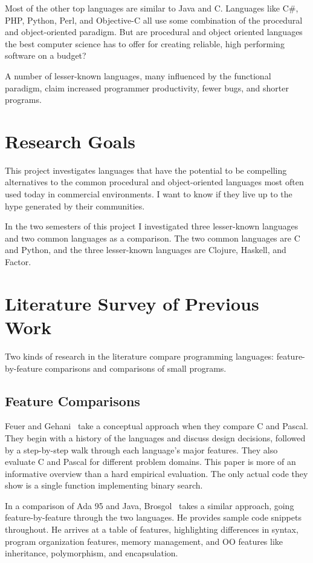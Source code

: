 \documentclass{article}
\begin{document}
Most of the other top languages are similar to Java and C.  Languages
like C\#, PHP, Python, Perl, and Objective-C all use some combination of the
procedural and object-oriented paradigm.   But are procedural and object
oriented languages the best computer science has to offer for creating
reliable, high performing software on a budget?

A number of lesser-known languages, many influenced by the functional
paradigm, claim increased programmer productivity, fewer bugs, and shorter
programs.

\section{Research Goals}

This project investigates languages that have the potential to be
compelling alternatives to the common procedural and object-oriented languages
most often used today in commercial environments.  I want to know if they live
up to the hype generated by their communities.

In the two semesters of this project I investigated three lesser-known
languages and two common languages as a comparison.  The two common languages
are C and Python, and the three lesser-known languages are Clojure, Haskell,
and Factor.  

\section{Literature Survey of Previous Work}
\label{sec:survey}

Two kinds of research in the literature compare programming languages:
feature-by-feature comparisons and comparisons of small programs.

\subsection{Feature Comparisons}

Feuer and Gehani~\cite{FeuerCVsPascal} take a conceptual approach when they compare C and
Pascal.  They begin with a history of the languages and
discuss design decisions, followed by a step-by-step walk through each
language's major features.  They also evaluate C and Pascal for different
problem domains.  This paper is more of an informative overview than a hard
empirical evaluation.  The only actual code they show is a single function
implementing binary search.

In a comparison of Ada 95 and Java, Brosgol~\cite{BrosgolCompOOAdaVsJava} takes
a similar approach, going feature-by-feature through the two languages.  He
provides sample code snippets throughout.  He arrives at a table of features,
highlighting differences in syntax, program organization features, memory
management, and OO features like inheritance, polymorphism, and encapsulation.
\end{document}
